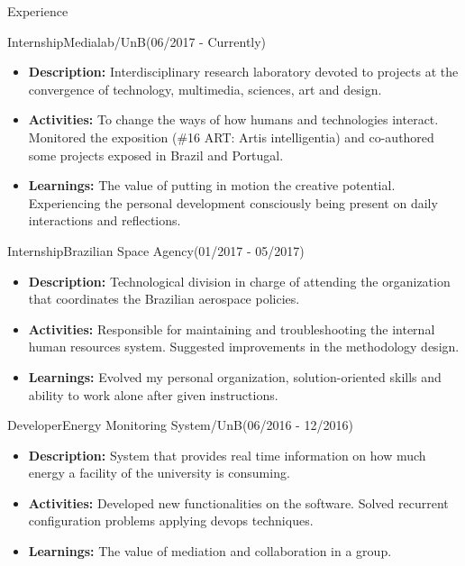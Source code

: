 \documentclass[]{fraguilarcv}
\begin{document}
\makeheader

\begin{cvsection}{Experience}
	\begin{cvsubsection}{Internship}{Medialab/UnB}{(06/2017 - Currently)}
		\begin{itemize}
			\item \textbf{Description:} Interdisciplinary research laboratory devoted to projects at the convergence of technology, multimedia, sciences, art and design.
			\item \textbf{Activities:} To change the ways of how humans and technologies interact. Monitored the exposition (\#16 ART: Artis intelligentia) and co-authored some projects exposed in Brazil and Portugal.
			\item \textbf{Learnings:} The value of putting in motion the creative potential. Experiencing the personal development consciously being present on daily interactions and reflections.
		\end{itemize}
	\end{cvsubsection}
	\begin{cvsubsection}{Internship}{Brazilian Space Agency}{(01/2017 - 05/2017)}
		\begin{itemize}
			\item \textbf{Description:} Technological division in charge of attending the organization that coordinates the Brazilian aerospace policies.
			\item \textbf{Activities:} Responsible for maintaining and troubleshooting the internal human resources system. Suggested improvements in the methodology design.
			\item \textbf{Learnings:} Evolved my personal organization, solution-oriented skills and ability to work alone after given instructions.
		\end{itemize}
	\end{cvsubsection}
	\begin{cvsubsection}{Developer}{Energy Monitoring System/UnB}{(06/2016 - 12/2016)}
		\begin{itemize}
			\item \textbf{Description:} System that provides real time information on how much energy a facility of the university is consuming.
			\item \textbf{Activities:} Developed new functionalities on the software. Solved recurrent configuration problems applying devops techniques.
			\item \textbf{Learnings:} The value of mediation and collaboration in a group.

\end{itemize}
\end{cvsubsection}
\end{cvsection}
\end{document}
